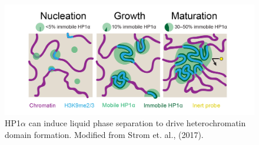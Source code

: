 \documentclass[onehalf,12pt]{beavtex}
\begin{document}
  \begin{figure}
  
  {\centering \includegraphics[width=1\linewidth, ]{./figure/introduction/droplet} 
  
  }
  
  \caption[HP1$\alpha$ can induce liquid phase separation to drive heterochromatin domain formation]{HP1$\alpha$ can induce liquid phase separation to drive heterochromatin domain formation. Modified from Strom et. al., (2017).}\label{fig:HP1droplet}
  \end{figure}
  
  \FloatBarrier 
  
\end{document}
